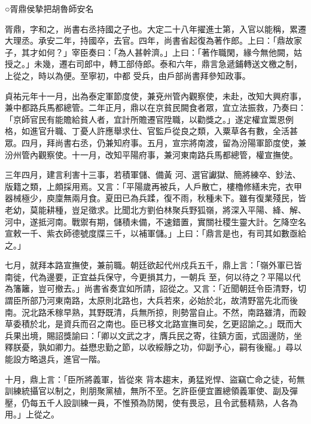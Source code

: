 
\begin{pinyinscope}

 ○胥鼎侯摯把胡魯師安名



 胥鼎，字和之，尚書右丞持國之子也。大定二十八年擢進士第，入官以能稱，累遷大理丞。承安二年，持國卒，去官。四年，尚書省起復為著作郎。上曰：「鼎故家子，其才如何？」宰臣奏曰：「為人甚幹濟。」上曰：「著作職閑，緣今無他闕，姑授之。」未幾，遷右司郎中，轉工部侍郎。泰和六年，鼎言急遞鋪轉送文檄之制，上從之，時以為便。至寧初，中都
 受兵，由戶部尚書拜參知政事。



 貞祐元年十一月，出為泰定軍節度使，兼兗州管內觀察使，未赴，改知大興府事，兼中都路兵馬都總管。二年正月，鼎以在京貧民闕食者眾，宜立法振救，乃奏曰：「京師官民有能贍給貧人者，宜計所贍遷官陞職，以勸獎之。」遂定權宜鬻恩例格，如進官升職、丁憂人許應舉求仕、官監戶從良之類，入粟草各有數，全活甚眾。四月，拜尚書右丞，仍兼知府事。五月，宣宗將南渡，留為汾陽軍節度使，兼汾州管內觀察使。十一月，改知平陽府事，兼河東南路兵馬都總管，權宣撫使。



 三年四月，建言利害十三事，若積軍儲、備黃
 河、選官讞獄、簡將練卒、鈔法、版籍之類，上頗採用焉。又言：「平陽歲再被兵，人戶散亡，樓櫓修繕未完，衣甲器械極少，庾廩無兩月食。夏田已為兵蹂，復不雨，秋種未下。雖有復業殘民，皆老幼，莫能耕種，豈足徵求。比聞北方劉伯林聚兵野狐嶺，將深入平陽、絳、解、河中，遂抵河南。戰禦有期，儲積未備，不速錯置，實關社稷生靈大計。乞降空名宣敕一千、紫衣師德號度牒三千，以補軍儲。」上曰：「鼎言是也，有司其如數亟給之。」



 七月，就拜本路宣撫使，兼前職。朝廷欲起代州戍兵五千，鼎上言：「嶺外軍已皆南徙，代為邊要，正宜益兵保守，今更損其力，一朝兵
 至，何以待之？平陽以代為籓籬，豈可撤去。」尚書省奏宜如所請，詔從之。又言：「近聞朝廷令臣清野，切謂臣所部乃河東南路，太原則北路也，大兵若來，必始於北，故清野當先北而後南。況北路禾稼早熟，其野既清，兵無所掠，則勢當自止。不然，南路雖清，而穀草委積於北，是資兵而召之南也。臣已移文北路宣撫司矣，乞更詔諭之。」既而大兵果出境，賜詔獎諭曰：「卿以文武之才，膺兵民之寄，往鎮方面，式固邊防，坐釋朕憂，孰如卿力。益懋忠勤之節，以收綏靜之功，仰副予心，嗣有後寵。」尋以能設方略退兵，進官一階。



 十月，鼎上言：「臣所將義軍，皆從來
 背本趨末，勇猛兇悍、盜竊亡命之徒，茍無訓練統攝官以制之，則朋聚黨植，無所不至。乞許臣便宜置總領義軍使、副及彈壓，仍每五千人設訓練一員，不惟預為防閑，使有畏忌，且令武藝精熟，人各為用。」上從之。




\end{pinyinscope}
